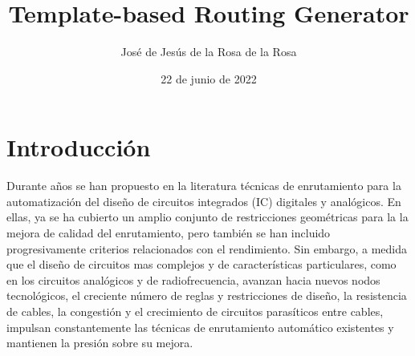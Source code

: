 \documentclass[reprint,amsmath,amssymb,aps]{revtex4-2}
\begin{document}

\title{Template-based Routing Generator}
\author{José de Jesús de la Rosa de la Rosa}
\date{22 de junio de 2022}

\begin{abstract}

\end{abstract}


\maketitle 

\section{Introducción}

Durante años se han propuesto en la literatura técnicas de enrutamiento para la automatización del diseño de circuitos integrados (IC) digitales y analógicos. En ellas, ya se ha cubierto un amplio conjunto de restricciones geométricas para la la mejora de calidad del enrutamiento, pero también se han incluido progresivamente criterios relacionados con el rendimiento. Sin embargo, a medida que el diseño de circuitos mas complejos y de características particulares, como en los circuitos analógicos y de radiofrecuencia, avanzan hacia nuevos nodos tecnológicos, el creciente número de reglas y restricciones de diseño, la resistencia de cables, la congestión y el crecimiento de circuitos parasíticos entre cables, impulsan constantemente las técnicas de enrutamiento automático existentes y mantienen la presión sobre su mejora.
\end{document}

